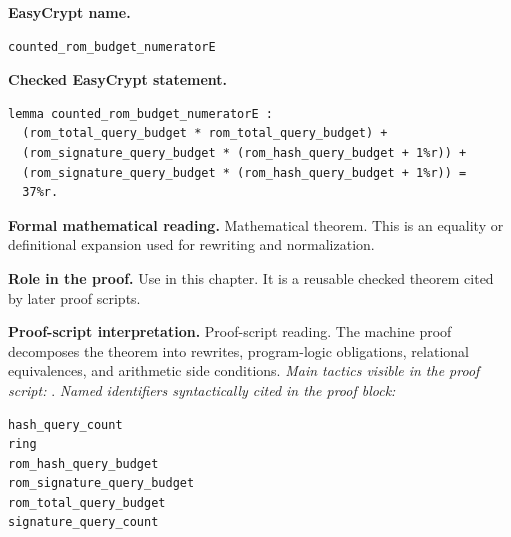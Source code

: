 \begin{formaltheorem}
\noindent\textbf{EasyCrypt name.}
\begin{lstlisting}[language=EasyCrypt,basicstyle=\ttfamily\scriptsize]
counted_rom_budget_numeratorE
\end{lstlisting}
\noindent\textbf{Checked EasyCrypt statement.}
\begin{lstlisting}[language=EasyCrypt,basicstyle=\ttfamily\scriptsize]
lemma counted_rom_budget_numeratorE :
  (rom_total_query_budget * rom_total_query_budget) +
  (rom_signature_query_budget * (rom_hash_query_budget + 1%r)) +
  (rom_signature_query_budget * (rom_hash_query_budget + 1%r)) =
  37%r.
\end{lstlisting}
\noindent\textbf{Formal mathematical reading.}
Mathematical theorem. This is an equality or definitional expansion used for rewriting and normalization.

\noindent\textbf{Role in the proof.}
Use in this chapter. It is a reusable checked theorem cited by later proof scripts.

\noindent\textbf{Proof-script interpretation.}
Proof-script reading. The machine proof decomposes the theorem into rewrites, program-logic obligations, relational equivalences, and arithmetic side conditions.
\emph{Main tactics visible in the proof script:} .
\emph{Named identifiers syntactically cited in the proof block:}
\begin{lstlisting}[language=EasyCrypt,basicstyle=\ttfamily\scriptsize]
hash_query_count
ring
rom_hash_query_budget
rom_signature_query_budget
rom_total_query_budget
signature_query_count
\end{lstlisting}

\end{formaltheorem}


